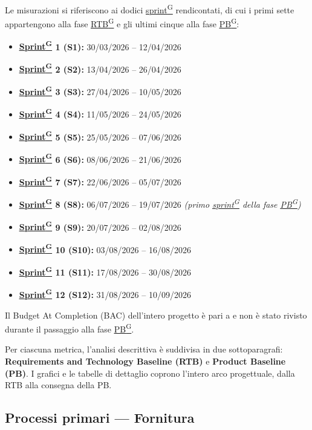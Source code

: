 \documentclass[a4paper,12pt]{article}
\providecommand{\glslink}[2]{\href{https://alittlebyte-19.github.io/Documentazione/glossario.html\#gls-#1}{\underline{#2}\textsuperscript{\scriptsize G}}}
\begin{document}
Le misurazioni si riferiscono ai dodici \glslink{sprint}{sprint} rendicontati, di cui i primi sette appartengono alla fase \glslink{rtb-requirements-and-technology-baseline}{RTB} e gli ultimi cinque alla fase \glslink{pb-product-baseline}{PB}:

\begin{itemize}
    \item \textbf{\glslink{sprint}{Sprint} 1 (S1):} 30/03/2026 – 12/04/2026
    \item \textbf{\glslink{sprint}{Sprint} 2 (S2):} 13/04/2026 – 26/04/2026
    \item \textbf{\glslink{sprint}{Sprint} 3 (S3):} 27/04/2026 – 10/05/2026
    \item \textbf{\glslink{sprint}{Sprint} 4 (S4):} 11/05/2026 – 24/05/2026
    \item \textbf{\glslink{sprint}{Sprint} 5 (S5):} 25/05/2026 – 07/06/2026
    \item \textbf{\glslink{sprint}{Sprint} 6 (S6):} 08/06/2026 – 21/06/2026
    \item \textbf{\glslink{sprint}{Sprint} 7 (S7):} 22/06/2026 – 05/07/2026
    \item \textbf{\glslink{sprint}{Sprint} 8 (S8):} 06/07/2026 – 19/07/2026 \textit{(primo \glslink{sprint}{sprint} della fase \glslink{pb-product-baseline}{PB})}
    \item \textbf{\glslink{sprint}{Sprint} 9 (S9):} 20/07/2026 – 02/08/2026
    \item \textbf{\glslink{sprint}{Sprint} 10 (S10):} 03/08/2026 – 16/08/2026
    \item \textbf{\glslink{sprint}{Sprint} 11 (S11):} 17/08/2026 – 30/08/2026
    \item \textbf{\glslink{sprint}{Sprint} 12 (S12):} 31/08/2026 – 10/09/2026
\end{itemize}

Il Budget At Completion (BAC) dell'intero progetto è pari a  e non è stato rivisto durante il passaggio alla fase \glslink{pb-product-baseline}{PB}.

Per ciascuna metrica, l'analisi descrittiva è suddivisa in due sottoparagrafi: \textbf{Requirements and Technology Baseline (RTB)} e \textbf{Product Baseline (PB)}. I grafici e le tabelle di dettaglio coprono l'intero arco progettuale, dalla RTB alla consegna della PB.
\subsection{Processi primari — Fornitura}
\end{document}
